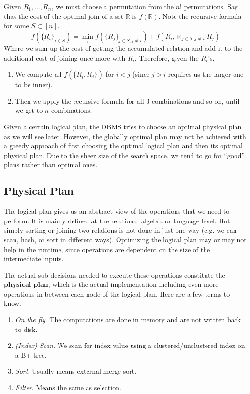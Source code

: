     \begin{algo}
      Given $R_1, \ldots, R_n$, we must choose a permutation from the $n!$ permutations. Say that the cost of the optimal join of a set $\mathbb{R}$ is $f(\mathbb{R})$. Note the recursive formula for some $S \subset [n]$. 
      \begin{equation}
        f(\{R_i\}_{i \in S}) = \min_i f(\{R_j\}_{j \in S, j \neq i}) + f(R_i, \bowtie_{j \in S, j \neq i} R_j) 
      \end{equation}
      Where we sum up the cost of getting the accumulated relation and add it to the additional cost of joining once more with $R_i$. Therefore, given the $R_i$'s, 
      \begin{enumerate}
        \item We compute all $f(\{R_i, R_j\})$ for $i < j$ (since $j > i$ requires us the larger one to be inner). 
        \item Then we apply the recursive formula for all 3-combinations and so on, until we get to $n$-combinations. 
      \end{enumerate}
    \end{algo}

    Given a certain logical plan, the DBMS tries to choose an optimal physical plan as we will see later. However, the globally optimal plan may not be achieved with a greedy approach of first choosing the optimal logical plan and then its optimal physical plan. Due to the sheer size of the search space, we tend to go for ``good'' plans rather than optimal ones. 

\subsection{Physical Plan}

    The logical plan gives us an abstract view of the operations that we need to perform. It is mainly defined at the relational algebra or language level. But simply sorting or joining two relations is not done 
    in just one way (e.g. we can scan, hash, or sort in different ways). Optimizing the logical plan may or may not help in the runtime, since operations are dependent on the size of the intermediate inputs. 

    \begin{definition}
      The actual sub-decisions needed to execute these operations constitute the \textbf{physical plan}, which is the actual implementation including even more operations in between each node of the logical plan. Here are a few terms to know. 
      \begin{enumerate}
        \item \textit{On the fly}. The computations are done in memory and are not written back to disk. 
        \item \textit{(Index) Scan}. We scan for index value using a clustered/unclustered index on a B+ tree. 
        \item \textit{Sort}. Usually means external merge sort. 
        \item \textit{Filter}. Means the same as selection. 
      \end{enumerate}
    \end{definition}

